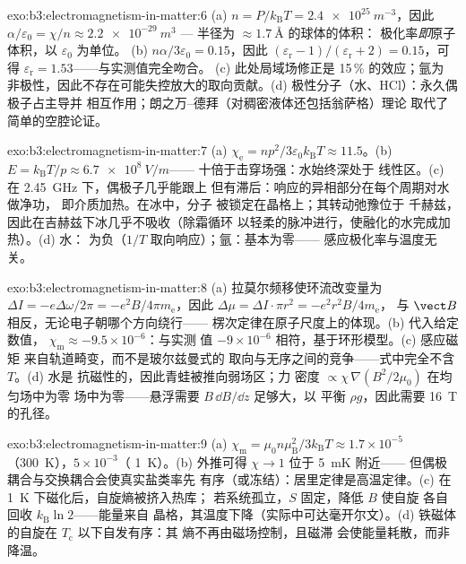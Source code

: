 \begin{solution}{exo:b3:electromagnetism-in-matter:6}
(a) $n = P/k_{\text{B}}T = \qty{2.4e25}{m^{-3}}$，因此
$\alpha/\varepsilon_0 = \chi/n \approx \qty{2.2e-29}{m^3}$ ---
半径为 $\approx\qty{1.7}{\angstrom}$ 的球体的体积：
极化率\emph{即}原子体积，以 $\varepsilon_0$ 为单位。
(b) $n\alpha/3\varepsilon_0 = 0.15$，因此 $(\varepsilon_{\text{r}} -
1)/(\varepsilon_{\text{r}} + 2) = 0.15$，可得
$\varepsilon_{\text{r}} = 1.53$——与实测值完全吻合。
(c) 此处局域场修正是 15\,\% 的效应；氩为
非极性，因此不存在可能失控放大的取向贡献。(d)
极性分子（水、HCl）：永久偶极子占主导并
相互作用；朗之万–德拜（对稠密液体还包括翁萨格）理论
取代了简单的空腔论证。
\end{solution}

\begin{solution}{exo:b3:electromagnetism-in-matter:7}
(a) $\chi_{\text{e}} = np^2/3\varepsilon_0k_{\text{B}}T \approx
11.5$。(b) $E = k_{\text{B}}T/p \approx \qty{6.7e8}{V/m}$——
十倍于击穿场强：水始终深处于
线性区。(c) 在 \qty{2.45}{GHz} 下，偶极子几乎能跟上
但有滞后：响应的异相部分在每个周期对水做净功，
即介质加热。在冰中，分子
被锁定在晶格上；其转动弛豫位于
千赫兹，因此在吉赫兹下冰几乎不吸收（除霜循环
以轻柔的脉冲进行，使融化的水完成加热）。(d) 水：
为负（$1/T$ 取向响应）；氩：基本为零——
感应极化率与温度无关。
\end{solution}

\begin{solution}{exo:b3:electromagnetism-in-matter:8}
(a) 拉莫尔频移使环流改变量为 $\Delta I
= -e\Delta\omega/2\pi = -e^2B/4\pi m_{\text{e}}$，因此
$\Delta\mu = \Delta I\cdot\pi r^2 = -e^2r^2B/4m_{\text{e}}$，
与 $\vect B$ 相反，无论电子朝哪个方向绕行——
楞次定律在原子尺度上的体现。(b) 代入给定数值，
$\chi_{\text{m}} \approx -9.5\times10^{-6}$：与实测
值 $-9\times10^{-6}$ 相符，基于环形模型。(c) 感应磁矩
来自轨道畸变，而不是玻尔兹曼式的
取向与无序之间的竞争——式中完全不含 $T$。(d) 水是
抗磁性的，因此青蛙被推向弱场区；力
密度 $\propto \chi\,\nabla(B^2/2\mu_0)$ 在均匀场中为零
场中为零——悬浮需要 $B\,\dd B/\dd z$ 足够大，以
平衡 $\rho g$，因此需要 \qty{16}{T} 的孔径。
\end{solution}

\begin{solution}{exo:b3:electromagnetism-in-matter:9}
(a) $\chi_{\text{m}} = \mu_0n\mu_{\text{B}}^2/3k_{\text{B}}T
\approx 1.7\times10^{-5}$（\qty{300}{K}），$5\times10^{-3}$（
\qty{1}{K}）。(b) 外推可得 $\chi \to 1$ 位于 \qty{5}{mK} 附近——
但偶极耦合与交换耦合会使真实盐类率先
有序（或冻结）：居里定律是高温定律。(c) 在
\qty{1}{K} 下磁化后，自旋熵被挤入热库；
若系统孤立，$S$ 固定，降低 $B$ 使自旋
各自回收 $k_{\text{B}}\ln 2$——能量来自
晶格，其温度下降（实际中可达毫开尔文）。(d)
铁磁体的自旋在 $T_{\text{c}}$ 以下自发有序：其
熵不再由磁场控制，且磁滞
会使能量耗散，而非降温。
\end{solution}


